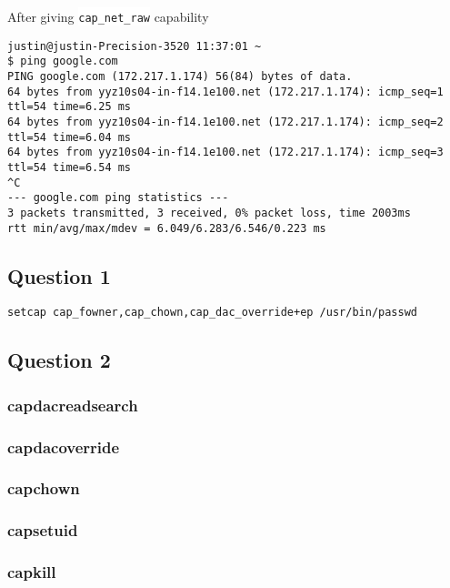 \documentclass[11pt,letterpaper]{article}
\let\OldTexttt\texttt
\renewcommand{\texttt}[1]{\OldTexttt{\footnotesize\colorbox{background}{\textcolor{foreground}{#1}}}}
\begin{document}
{After giving \texttt{cap\_net\_raw} capability
\lstset{language=sh,label= ,caption= ,captionpos=b,numbers=none}
\begin{lstlisting}
justin@justin-Precision-3520 11:37:01 ~
$ ping google.com
PING google.com (172.217.1.174) 56(84) bytes of data.
64 bytes from yyz10s04-in-f14.1e100.net (172.217.1.174): icmp_seq=1 ttl=54 time=6.25 ms
64 bytes from yyz10s04-in-f14.1e100.net (172.217.1.174): icmp_seq=2 ttl=54 time=6.04 ms
64 bytes from yyz10s04-in-f14.1e100.net (172.217.1.174): icmp_seq=3 ttl=54 time=6.54 ms
^C
--- google.com ping statistics ---
3 packets transmitted, 3 received, 0% packet loss, time 2003ms
rtt min/avg/max/mdev = 6.049/6.283/6.546/0.223 ms
\end{lstlisting}

\subsection*{Question 1}
\label{sec:org69af459}

\lstset{language=cpp,label= ,caption= ,captionpos=b,numbers=none}
\begin{lstlisting}
setcap cap_fowner,cap_chown,cap_dac_override+ep /usr/bin/passwd
\end{lstlisting}

\subsection*{Question 2}
\label{sec:orgd04a8b4}

\subsubsection*{capdacreadsearch}
\label{sec:orgc788dc1}
\subsubsection*{capdacoverride}
\label{sec:org7292456}
\subsubsection*{capchown}
\label{sec:org5dfbd06}
\subsubsection*{capsetuid}
\label{sec:orga680060}
\subsubsection*{capkill}
\label{sec:orgfdd12e9}
}
\end{document}
